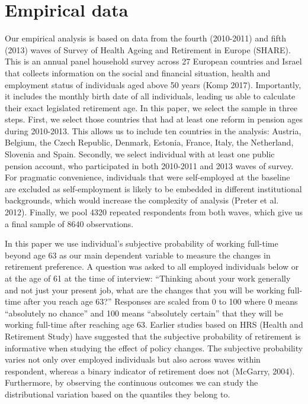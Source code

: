 \documentclass[a4paper]{article}
\begin{document}
\section{Empirical data}

Our empirical analysis is based on data from the fourth (2010-2011) and fifth (2013) waves of Survey of Health Ageing and Retirement in Europe (SHARE). This is an annual panel household survey across 27 European countries and Israel that collects information on the social and financial situation, health and employment status of individuals aged above 50 years (Komp 2017). Importantly, it includes the monthly birth date of all individuals, leading us able to calculate their exact legislated retirement age. In this paper, we select the sample in three steps. First, we select those countries that had at least one reform in pension ages during 2010-2013. This allows us to include ten countries in the analysis: Austria, Belgium, the Czech Republic, Denmark, Estonia, France, Italy, the Netherland, Slovenia and Spain. Secondly, we select individual with at least one public pension account, who participated in both 2010-2011 and 2013 waves of survey. For pragmatic convenience, individuals that were self-employed at the baseline are excluded as self-employment is likely to be embedded in different institutional backgrounds, which would increase the complexity of analysis (Preter et al. 2012).  Finally, we pool 4320 repeated respondents from both waves, which give us a final sample of 8640 observations.

In this paper we use individual’s subjective probability of working full-time beyond age 63 as our main dependent variable to measure the changes in retirement preference. A question was asked to all employed individuals below or at the age of 61 at the time of interview: “Thinking about your work generally and not just your present job, what are the changes that you will be working full-time after you reach age 63?” Responses are scaled from 0 to 100 where 0 means “absolutely no chance” and 100 means “absolutely certain” that they will be working full-time after reaching age 63.  Earlier studies based on HRS (Health and Retirement Study) have suggested that the subjective probability of retirement is informative when studying the effect of policy changes. The subjective probability varies not only over employed individuals but also across waves within respondent, whereas a binary indicator of retirement does not (McGarry, 2004).  Furthermore, by observing the continuous outcomes we can study the distributional variation based on the quantiles they belong to. 
\end{document}
